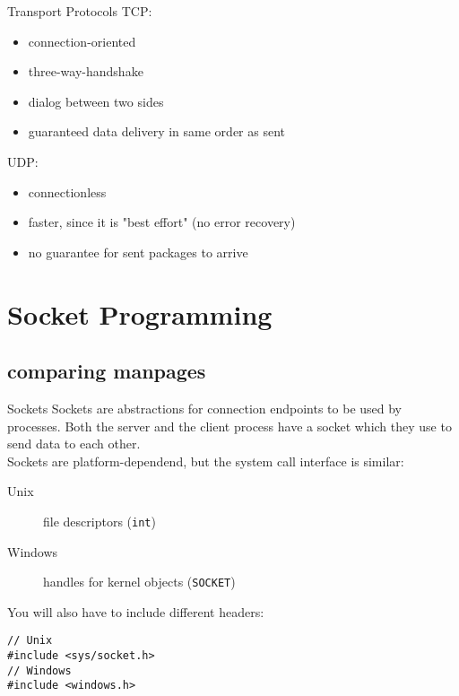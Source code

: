 \begin{frame}{Transport Protocols}
    TCP:
    \begin{itemize}
        \item connection-oriented
        \item three-way-handshake
        \item dialog between two sides
        \item guaranteed data delivery in same order as sent
    \end{itemize}
    UDP:
    \begin{itemize}
        \item connectionless
    	\item faster, since it is "best effort" (no error recovery)
		\item no guarantee for sent packages to arrive    	
    \end{itemize}
\end{frame}

\section{Socket Programming}
\subsection*{comparing manpages}

\begin{frame}[fragile]{Sockets}
    Sockets are abstractions for connection endpoints to be used by processes.
    Both the server and the client process have a socket which they use to
    send data to each other.\\
    \bigskip
    Sockets are platform-dependend, but the system call interface is similar:
    \begin{description}
        \item[Unix] file descriptors (\lstinline{int})
        \item[Windows] handles for kernel objects
            (\lstinline[morekeywords={*,SOCKET}]{SOCKET})
    \end{description}
    \bigskip
    You will also have to include different headers:
    \begin{lstlisting}[numbers=none]
// Unix
#include <sys/socket.h>
// Windows
#include <windows.h>
\end{lstlisting}
\end{frame}

